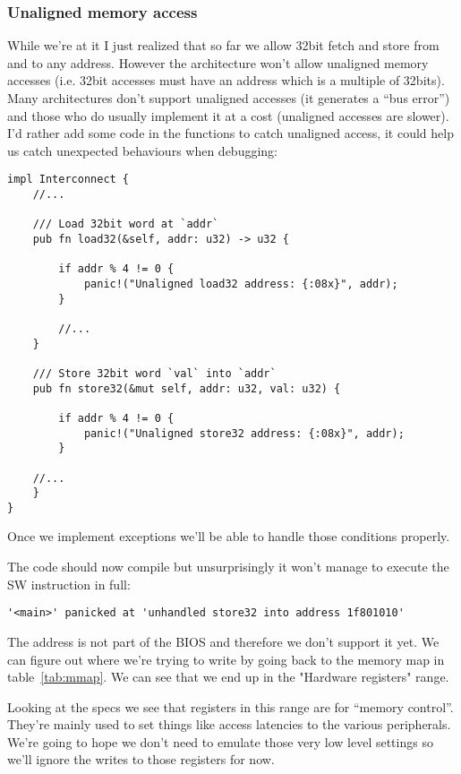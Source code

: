 \documentclass[a4paper]{article}
\begin{document}
\subsubsection{Unaligned memory access}

While we're at it I just realized that so far we allow 32bit fetch and
store from and to any address. However the architecture won't allow
unaligned memory accesses (i.e. 32bit accesses must have an address
which is a multiple of 32bits). Many architectures don't support
unaligned accesses (it generates a ``bus error'') and those who do
usually implement it at a cost (unaligned accesses are slower). I'd
rather add some code in the functions to catch unaligned access, it
could help us catch unexpected behaviours when debugging:

\begin{lstlisting}
impl Interconnect {
    //...

    /// Load 32bit word at `addr`
    pub fn load32(&self, addr: u32) -> u32 {

        if addr % 4 != 0 {
            panic!("Unaligned load32 address: {:08x}", addr);
        }

        //...
    }

    /// Store 32bit word `val` into `addr`
    pub fn store32(&mut self, addr: u32, val: u32) {

        if addr % 4 != 0 {
            panic!("Unaligned store32 address: {:08x}", addr);
        }

	//...
    }
}
\end{lstlisting}

Once we implement exceptions we'll be able to handle those conditions
properly.

The code should now compile but unsurprisingly it won't manage to
execute the SW instruction in full:

\begin{verbatim}
'<main>' panicked at 'unhandled store32 into address 1f801010'
\end{verbatim}

The address is not part of the BIOS and therefore we don't support it
yet. We can figure out where we're trying to write by going back to
the memory map in table~\ref{tab:mmap}. We can see that we end up in
the "Hardware registers" range.

Looking at the specs we see that registers in this range are for
``memory control''. They're mainly used to set things like access
latencies to the various peripherals. We're going to hope we don't
need to emulate those very low level settings so we'll ignore the
writes to those registers for now.
\end{document}
